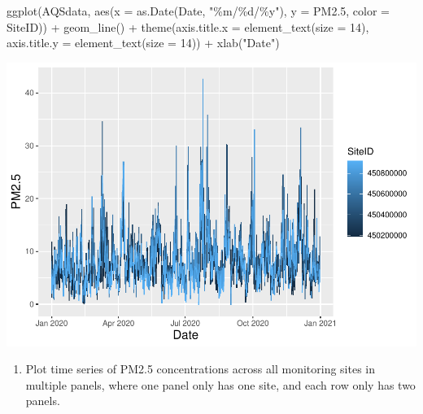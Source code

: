 \documentclass[
]{article}
\newenvironment{Shaded}{\begin{snugshade}}{\end{snugshade}}
\newcommand{\AttributeTok}[1]{\textcolor[rgb]{0.77,0.63,0.00}{#1}}
\newcommand{\DecValTok}[1]{\textcolor[rgb]{0.00,0.00,0.81}{#1}}
\newcommand{\FloatTok}[1]{\textcolor[rgb]{0.00,0.00,0.81}{#1}}
\newcommand{\FunctionTok}[1]{\textcolor[rgb]{0.00,0.00,0.00}{#1}}
\newcommand{\NormalTok}[1]{#1}
\newcommand{\SpecialCharTok}[1]{\textcolor[rgb]{0.00,0.00,0.00}{#1}}
\newcommand{\StringTok}[1]{\textcolor[rgb]{0.31,0.60,0.02}{#1}}
\providecommand{\tightlist}{%
  \setlength{\itemsep}{0pt}\setlength{\parskip}{0pt}}
\begin{document}
\begin{Shaded}
\begin{Highlighting}[]
\FunctionTok{ggplot}\NormalTok{(AQSdata, }\FunctionTok{aes}\NormalTok{(}\AttributeTok{x =} \FunctionTok{as.Date}\NormalTok{(Date, }\StringTok{"\%m/\%d/\%y"}\NormalTok{), }\AttributeTok{y =}\NormalTok{ PM2}\FloatTok{.5}\NormalTok{,}
    \AttributeTok{color =}\NormalTok{ SiteID)) }\SpecialCharTok{+} \FunctionTok{geom\_line}\NormalTok{() }\SpecialCharTok{+} \FunctionTok{theme}\NormalTok{(}\AttributeTok{axis.title.x =} \FunctionTok{element\_text}\NormalTok{(}\AttributeTok{size =} \DecValTok{14}\NormalTok{),}
    \AttributeTok{axis.title.y =} \FunctionTok{element\_text}\NormalTok{(}\AttributeTok{size =} \DecValTok{14}\NormalTok{)) }\SpecialCharTok{+} \FunctionTok{xlab}\NormalTok{(}\StringTok{"Date"}\NormalTok{)}
\end{Highlighting}
\end{Shaded}

\includegraphics{HW1-Trinath-Sai-Subhash-Reddy-Pittala_files/figure-latex/unnamed-chunk-25-1.pdf}

\begin{enumerate}
\def\labelenumi{\roman{enumi}.}
\tightlist
\item
  Plot time series of PM2.5 concentrations across all monitoring sites
  in multiple panels, where one panel only has one site, and each row
  only has two panels.
\end{enumerate}
\end{document}
